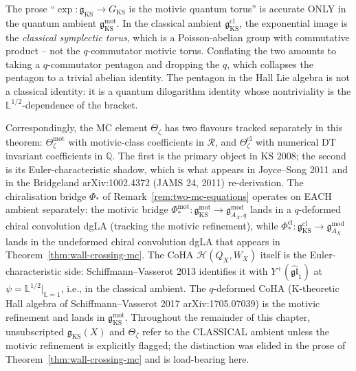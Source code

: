 \begin{remark}
\label{rem:ks-quantum-vs-classical-ambient}
The prose
``$\exp \colon \mathfrak{g}_{\mathrm{KS}} \to G_{\mathrm{KS}}$ is the
motivic quantum torus'' is accurate ONLY in the quantum ambient
$\mathfrak{g}_{\mathrm{KS}}^{\mathrm{mot}}$. In the classical ambient
$\mathfrak{g}_{\mathrm{KS}}^{\mathrm{cl}}$, the exponential image is
the \emph{classical symplectic torus}, which is a Poisson-abelian
group with commutative product -- not the $q$-commutator motivic
torus. Conflating the two amounts to taking a $q$-commutator pentagon
and dropping the $q$, which collapses the pentagon to a trivial
abelian identity. The pentagon in the Hall Lie algebra is not a
classical identity: it is a quantum dilogarithm identity whose
nontriviality is the $\mathbb{L}^{1/2}$-dependence of the bracket.

Correspondingly, the MC element $\Theta_\zeta$ has two flavours
tracked separately in this theorem:
$\Theta^{\mathrm{mot}}_\zeta$ with motivic-class coefficients in
$\mathcal{R}$, and $\Theta^{\mathrm{cl}}_\zeta$ with numerical DT
invariant coefficients in $\mathbb{Q}$. The first is the primary
object in KS 2008; the second is its Euler-characteristic shadow,
which is what appears in Joyce--Song 2011 and in the Bridgeland
\textup{arXiv:1002.4372} (JAMS 24, 2011) re-derivation. The chiralisation bridge $\Phi_*$ of
Remark~\ref{rem:two-mc-equations} operates on EACH ambient
separately: the motivic bridge
$\Phi_*^{\mathrm{mot}} \colon \mathfrak{g}_{\mathrm{KS}}^{\mathrm{mot}}
 \to \mathfrak{g}^{\mathrm{mod}}_{A_X, q}$
lands in a $q$-deformed chiral convolution dgLA (tracking the
motivic refinement), while
$\Phi_*^{\mathrm{cl}} \colon \mathfrak{g}_{\mathrm{KS}}^{\mathrm{cl}}
 \to \mathfrak{g}^{\mathrm{mod}}_{A_X}$
lands in the undeformed chiral convolution dgLA that appears in
Theorem~\ref{thm:wall-crossing-mc}. The CoHA $\mathcal{H}(Q_X, W_X)$
itself is the Euler-characteristic side: Schiffmann--Vasserot 2013
identifies it with $Y^+(\widehat{\mathfrak{gl}}_1)$ at
$\psi = \mathbb{L}^{1/2}|_{\mathbb{L} = 1}$, i.e., in the classical
ambient. The $q$-deformed CoHA (K-theoretic Hall algebra of
Schiffmann--Vasserot 2017 \textup{arXiv:1705.07039}) is the motivic
refinement and lands in $\mathfrak{g}_{\mathrm{KS}}^{\mathrm{mot}}$.
Throughout the remainder of this chapter, unsubscripted
$\mathfrak{g}_{\mathrm{KS}}(X)$ and $\Theta_\zeta$ refer to the
CLASSICAL ambient unless the motivic refinement is explicitly
flagged; the distinction was elided in the prose of
Theorem~\ref{thm:wall-crossing-mc} and is load-bearing here.
\end{remark}

